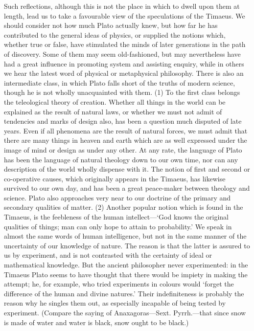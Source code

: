 Such reflections, although this is not the place in which to dwell upon
them at length, lead us to take a favourable view of the speculations of
the Timaeus. We should consider not how much Plato actually knew, but how
far he has contributed to the general ideas of physics, or supplied the
notions which, whether true or false, have stimulated the minds of later
generations in the path of discovery. Some of them may seem old-fashioned,
but may nevertheless have had a great influence in promoting system and
assisting enquiry, while in others we hear the latest word of physical or
metaphysical philosophy. There is also an intermediate class, in which
Plato falls short of the truths of modern science, though he is not wholly
unacquainted with them. (1) To the first class belongs the teleological
theory of creation. Whether all things in the world can be explained as
the result of natural laws, or whether we must not admit of tendencies and
marks of design also, has been a question much disputed of late years.
Even if all phenomena are the result of natural forces, we must admit that
there are many things in heaven and earth which are as well expressed
under the image of mind or design as under any other. At any rate, the
language of Plato has been the language of natural theology down to our
own time, nor can any description of the world wholly dispense with it.
The notion of first and second or co-operative causes, which originally
appears in the Timaeus, has likewise survived to our own day, and has been
a great peace-maker between theology and science. Plato also approaches
very near to our doctrine of the primary and secondary qualities of
matter. (2) Another popular notion which is found in the Timaeus, is the
feebleness of the human intellect—‘God knows the original qualities
of things; man can only hope to attain to probability.’ We speak in almost
the same words of human intelligence, but not in the same manner of the
uncertainty of our knowledge of nature. The reason is that the latter is
assured to us by experiment, and is not contrasted with the certainty of
ideal or mathematical knowledge. But the ancient philosopher never
experimented: in the Timaeus Plato seems to have thought that there would
be impiety in making the attempt; he, for example, who tried experiments
in colours would ‘forget the difference of the human and divine natures.’
Their indefiniteness is probably the reason why he singles them out, as
especially incapable of being tested by experiment. (Compare the saying of
Anaxagoras—Sext. Pyrrh.—that since snow is made of water and
water is black, snow ought to be black.)

